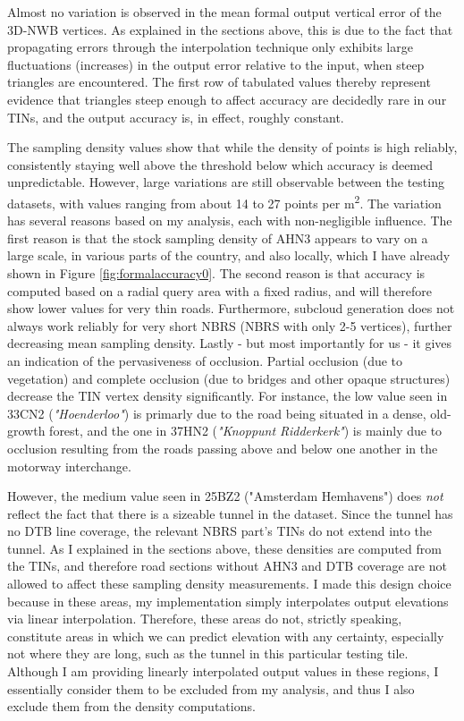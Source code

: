 Almost no variation is observed in the mean formal output vertical error of the 3D-NWB vertices. As explained in the sections above, this is due to the fact that propagating errors through the interpolation technique only exhibits large fluctuations (increases) in the output error relative to the input, when steep triangles are encountered. The first row of tabulated values thereby represent evidence that triangles steep enough to affect accuracy are decidedly rare in our TINs, and the output accuracy is, in effect, roughly constant.

The sampling density values show that while the density of points is high reliably, consistently staying well above the threshold below which accuracy is deemed unpredictable. However, large variations are still observable between the testing datasets, with values ranging from about 14 to 27 points per m\textsuperscript{2}. The variation has several reasons based on my analysis, each with non-negligible influence. The first reason is that the stock sampling density of AHN3 appears to vary on a large scale, in various parts of the country, and also locally, which I have already shown in Figure \ref{fig:formalaccuracy0}. The second reason is that accuracy is computed based on a radial query area with a fixed radius, and will therefore show lower values for very thin roads. Furthermore, subcloud generation does not always work reliably for very short NBRS (NBRS with only 2-5 vertices), further decreasing mean sampling density. Lastly - but most importantly for us - it gives an indication of the pervasiveness of occlusion. Partial occlusion (due to vegetation) and complete occlusion (due to bridges and other opaque structures) decrease the TIN vertex density significantly. For instance, the low value seen in 33CN2 (\textit{"Hoenderloo"}) is primarly due to the road being situated in a dense, old-growth forest, and the one in 37HN2 (\textit{"Knoppunt Ridderkerk"}) is mainly due to occlusion resulting from the roads passing above and below one another in the motorway interchange.

However, the medium value seen in 25BZ2 ("Amsterdam Hemhavens") does \textit{not} reflect the fact that there is a sizeable tunnel in the dataset. Since the tunnel has no DTB line coverage, the relevant NBRS part's TINs do not extend into the tunnel. As I explained in the sections above, these densities are computed from the TINs, and therefore road sections without AHN3 and DTB coverage are not allowed to affect these sampling density measurements. I made this design choice because in these areas, my implementation simply interpolates output elevations via linear interpolation. Therefore, these areas do not, strictly speaking, constitute areas in which we can predict elevation with any certainty, especially not where they are long, such as the tunnel in this particular testing tile. Although I am providing linearly interpolated output values in these regions, I essentially consider them to be excluded from my analysis, and thus I also exclude them from the density computations.

